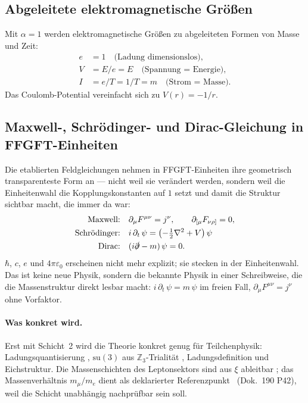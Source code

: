 \subsection*{Abgeleitete elektromagnetische Größen}

Mit $\alpha=1$ werden elektromagnetische Größen zu abgeleiteten Formen von
Masse und Zeit:
\begin{align*}
  e &= 1 \quad \text{(Ladung dimensionslos)},\\
  V &= E/e = E \quad \text{(Spannung = Energie)},\\
  I &= e/T = 1/T = m \quad \text{(Strom = Masse)}.
\end{align*}
Das Coulomb-Potential vereinfacht sich zu $V(r)=-1/r$.

\subsection*{Maxwell-, Schrödinger- und Dirac-Gleichung in FFGFT-Einheiten}

Die etablierten Feldgleichungen nehmen in FFGFT-Einheiten ihre geometrisch
transparenteste Form an --- nicht weil sie verändert werden, sondern weil
die Einheitenwahl die Kopplungskonstanten auf $1$ setzt und damit die
Struktur sichtbar macht, die immer da war:
\begin{align*}
\text{Maxwell:}\quad &
  \partial_\mu F^{\mu\nu} = j^\nu, \qquad
  \partial_{[\mu}F_{\nu\rho]}=0,\\
\text{Schrödinger:}\quad &
  i\,\partial_t\,\psi = \left(-\tfrac12\nabla^2 + V\right)\psi\\
\text{Dirac:}\quad &
  (i\slashed\partial - m)\,\psi = 0.
\end{align*}
$\hbar$, $c$, $e$ und $4\pi\varepsilon_0$ erscheinen nicht mehr explizit;
sie stecken in der Einheitenwahl. Das ist keine neue Physik, sondern die
bekannte Physik in einer Schreibweise, die die Massenstruktur direkt lesbar
macht: $i\,\partial_t\,\psi = m\,\psi$ im freien Fall, $\partial_\mu F^{\mu\nu}=j^\nu$
ohne Vorfaktor.

\paragraph{Was konkret wird.}
Erst mit Schicht~2 wird die Theorie konkret genug für Teilchenphysik: Ladungsquantisierung
\BM, $\mathrm{su}(3)$ aus $\mathbb{Z}_3$-Trialität \BM, Ladungsdefinition und
Eichstruktur. Die Massenschichten des Leptonsektors sind aus $\xi$ ableitbar \KM;
das Massenverhältnis $m_\mu/m_e$ dient als deklarierter Referenzpunkt \SetzM\ (Dok.~190
P42), weil die Schicht unabhängig nachprüfbar sein soll.

